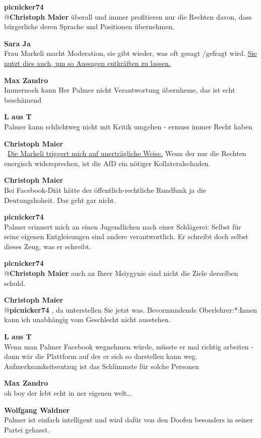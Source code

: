 \documentclass[]{article}
\begin{document}
\textbf{picnicker74}\\
@\textbf{Christoph Maier} überall und immer profitieren nur die Rechten
davon, dass bürgerliche deren Sprache und Positionen übernehmen.

\textbf{Sara Ja}\\
Frau Markeli macht Moderation, sie gibt wieder, was oft gesagt /gefragt
wird.
\hyperref[timeout]{Sie nutzt dies auch, um so Aussagen
entkräften zu lassen.}

\textbf{Max Zandro}\\
Immernoch kann Her Palmer nicht Verantwortung übernheme, das ist echt
beschämend

\textbf{L aus T}\\
Palmer kann schlichtweg nicht mit Kritik umgehen - ermuss immer Recht
haben

\textbf{Christoph Maier}\\
~\hyperref[timeout]{Die Markeli triggert mich auf unerträgliche
Weise.} Wenn der nur die Rechten energisch widersprechen, ist die AfD
ein nötiger Kollateralschaden.

\textbf{Christoph Maier}\\
Bei Facebook-Diät hätte der öffentlich-rechtliche Rundfunk ja die Deutungshoheit\cite{deutungshoheit}. Das geht gar nicht.

\textbf{picnicker74}\\
Palmer erinnert mich an einen Jugendlichen nach einer Schlägerei:
Selbst für seine eigenen Entgleisungen sind andere verantwortlich. Er
schreibt doch selbst dieses Zeug, was er schreibt.

\textbf{picnicker74}\\
@\textbf{Christoph Maier} auch an Ihrer Msiygynie sind nicht die Ziele
derselben schuld.

\textbf{Christoph Maier}\\
@\textbf{picnicker74} , da unterstellen Sie jetzt was. Bevormundende
Oberlehrer:*:Innen kann ich unabhängig vom Geschlecht nicht ausstehen.

\textbf{L aus T}\\
Wenn man Palmer Facebook wegnehmen würde, müsste er mal richtig
arbeiten - dann wär die Plattform auf der er sich so darstellen kann
weg. Aufmerksamkeitsentzug ist das Schlimmste für solche Personen

\textbf{Max Zandro}\\
oh boy der lebt echt in ner eigenen welt\ldots{}

\textbf{Wolfgang Waldner}\\
Palmer ist einfach intelligent und wird dafür von den Doofen besonders
in seiner Partei gehasst.
\end{document}
